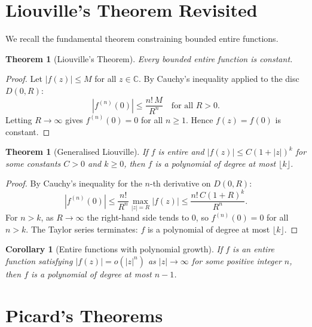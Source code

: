 \documentclass[12pt,a4paper,openany]{book}
\theoremstyle{definition}
\theoremstyle{plain}
\newtheorem{theorem}[definition]{Theorem}
\newtheorem{corollary}[definition]{Corollary}
\theoremstyle{remark}
\newcommand{\C}{\mathbb{C}}
\newcommand{\abs}[1]{\left|#1\right|}
\begin{document}
\section{Liouville's Theorem Revisited}\label{sec:liouville-revisited}

We recall the fundamental theorem constraining bounded entire functions.

\begin{theorem}[Liouville's Theorem]\label{thm:liouville-revisited}
Every bounded entire function is constant.
\end{theorem}

\begin{proof}
Let $\abs{f(z)} \leq M$ for all $z \in \C$. By Cauchy's inequality
applied to the disc $D(0, R)$:
\[
  \abs{f^{(n)}(0)} \leq \frac{n!\, M}{R^n}
  \quad \text{for all } R > 0.
\]
Letting $R \to \infty$ gives $f^{(n)}(0) = 0$ for all $n \geq 1$.
Hence $f(z) = f(0)$ is constant.
\end{proof}

\begin{theorem}[Generalised Liouville]\label{thm:gen-liouville}
If $f$ is entire and $\abs{f(z)} \leq C(1 + \abs{z})^k$ for some
constants $C > 0$ and $k \geq 0$, then $f$ is a polynomial of degree
at most $\lfloor k \rfloor$.
\end{theorem}

\begin{proof}
By Cauchy's inequality for the $n$-th derivative on $D(0,R)$:
\[
  \abs{f^{(n)}(0)} \leq \frac{n!}{R^n}
  \max_{\abs{z}=R}\abs{f(z)}
  \leq \frac{n!\, C(1+R)^k}{R^n}.
\]
For $n > k$, as $R \to \infty$ the right-hand side tends to $0$,
so $f^{(n)}(0) = 0$ for all $n > k$. The Taylor series terminates:
$f$ is a polynomial of degree at most $\lfloor k \rfloor$.
\end{proof}

\begin{corollary}[Entire functions with polynomial growth]\label{cor:poly-growth}
If $f$ is an entire function satisfying $\abs{f(z)} = o(\abs{z}^n)$
as $\abs{z}\to\infty$ for some positive integer $n$, then $f$ is a
polynomial of degree at most $n-1$.
\end{corollary}

\section{Picard's Theorems}\label{sec:picard}
\end{document}
